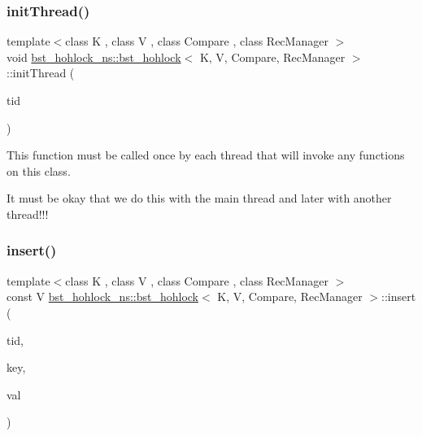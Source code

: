 \subsubsection{\texorpdfstring{init\+Thread()}{initThread()}}
{\footnotesize\ttfamily template$<$class K , class V , class Compare , class Rec\+Manager $>$ \\
void \hyperlink{classbst__hohlock__ns_1_1bst__hohlock}{bst\+\_\+hohlock\+\_\+ns\+::bst\+\_\+hohlock}$<$ K, V, Compare, Rec\+Manager $>$\+::init\+Thread (\begin{DoxyParamCaption}\item[{const int}]{tid }\end{DoxyParamCaption})\hspace{0.3cm}{\ttfamily [inline]}}

This function must be called once by each thread that will invoke any functions on this class.

It must be okay that we do this with the main thread and later with another thread!!! \mbox{\label{classbst__hohlock__ns_1_1bst__hohlock_a9b46afa8c7037bee15ccd8f719f7da22}} 
\subsubsection{\texorpdfstring{insert()}{insert()}}
{\footnotesize\ttfamily template$<$class K , class V , class Compare , class Rec\+Manager $>$ \\
const V \hyperlink{classbst__hohlock__ns_1_1bst__hohlock}{bst\+\_\+hohlock\+\_\+ns\+::bst\+\_\+hohlock}$<$ K, V, Compare, Rec\+Manager $>$\+::insert (\begin{DoxyParamCaption}\item[{const int}]{tid,  }\item[{const K \&}]{key,  }\item[{const V \&}]{val }\end{DoxyParamCaption})\hspace{0.3cm}{\ttfamily [inline]}}

\mbox{\label{classbst__hohlock__ns_1_1bst__hohlock_ac1edcbbd3a0568d015e9557b500b6595}} 
